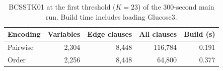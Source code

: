 \begin{table}[htbp]\centering\small
\caption{BCSSTK01 at the first threshold ($K=23$) of the 300-second main run. Build time includes loading Glucose3.}
\label{tab:k23}\begin{tabular}{lrrrr}\hline
Encoding & Variables & Edge clauses & All clauses & Build (s)\\\hline
Pairwise & 2,304 & 8,448 & 116,784 & 0.191\\
Order & 2,256 & 8,448 & 64,800 & 0.377\\
\hline\end{tabular}\end{table}
